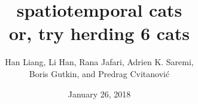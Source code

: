 


\title{ 			spatiotemporal cats
       \\ \Huge 	or, try herding 6 cats
        \\\vspace{1.0cm}
        }\author{
        Han Liang,
        Li Han,
        Rana Jafari,
		Adrien K. Saremi,
    \\
        Boris Gutkin,
         and
        Predrag Cvitanovi\'{c}
        }

        \date{January 26, 2018} \Private{\date{\today}}
